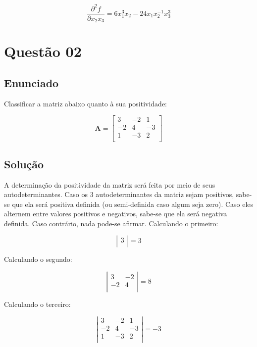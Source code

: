 \documentclass[10pt, a4paper]{article}
\begin{document}
\begin{equation}\label{q01:dx2x3}
    \frac{\partial^2 f}{\partial x_2x_3} = 6x_1^3x_2 - 24x_1x_2^{-1}x_3^3
\end{equation}



\section{Questão 02}

\subsection{Enunciado}

Classificar a matriz abaixo quanto à sua positividade:

\[
  \mathbf{A} =
  \left[ {\begin{array}{ccc}
     3 & -2 &  1 \\
    -2 &  4 & -3 \\
     1 & -3 &  2 \\
  \end{array} } \right]
\]

\subsection{Solução}

A determinação da positividade da matriz será feita por meio de seus autodeterminantes. 
Caso os 3 autodeterminantes da matriz sejam positivos, sabe-se que ela será positiva definida (ou semi-definida caso algum seja zero). 
Caso eles alternem entre valores positivos e negativos, sabe-se que ela será negativa definida. Caso contrário,
nada pode-se afirmar. Calculando o primeiro:

\[
  \left| {\begin{array}{c}
    3\\
  \end{array} } \right| = 3
\]

Calculando o segundo:

\[
  \left| {\begin{array}{cc}
     3 & -2 \\
    -2 &  4 \\
  \end{array} } \right| = 8
\]

Calculando o terceiro:

\[
  \left| {\begin{array}{ccc}
     3 & -2 &  1 \\
    -2 &  4 & -3 \\
     1 & -3 &  2 \\
  \end{array} } \right| = -3
\]
\end{document}

